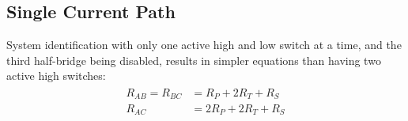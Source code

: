 \documentclass[12pt,a4paper,oneside,openany]{article}
\begin{document}
\subsection{Single Current Path}

System identification  with only one active high and low switch at a time, and the third half-bridge being disabled, results in simpler equations than having two active high switches:
\begin{gather}
\begin{aligned}
R_{AB} = R_{BC} &= R_P + 2 R_T + R_S \\
R_{AC} &= 2 R_P + 2 R_T + R_S \\
\end{aligned}
\end{gather}


\nocite{*}

%
%
\printbibliography
\end{document}
